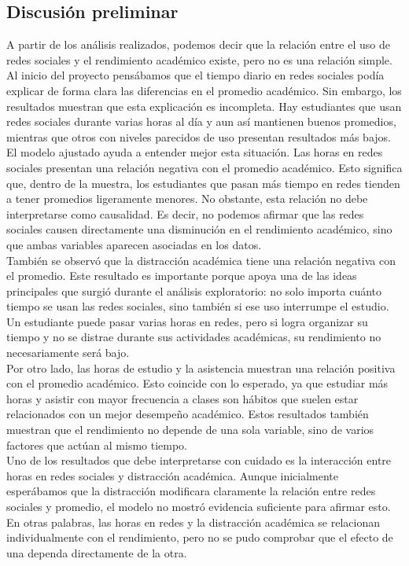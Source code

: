 \documentclass[12pt]{article}
\begin{document}
\subsection{Discusión preliminar}

A partir de los análisis realizados, podemos decir que la relación entre el uso de redes sociales y el rendimiento académico existe, pero no es una relación simple. Al inicio del proyecto pensábamos que el tiempo diario en redes sociales podía explicar de forma clara las diferencias en el promedio académico. Sin embargo, los resultados muestran que esta explicación es incompleta. Hay estudiantes que usan redes sociales durante varias horas al día y aun así mantienen buenos promedios, mientras que otros con niveles parecidos de uso presentan resultados más bajos.
\\

El modelo ajustado ayuda a entender mejor esta situación. Las horas en redes sociales presentan una relación negativa con el promedio académico. Esto significa que, dentro de la muestra, los estudiantes que pasan más tiempo en redes tienden a tener promedios ligeramente menores. No obstante, esta relación no debe interpretarse como causalidad. Es decir, no podemos afirmar que las redes sociales causen directamente una disminución en el rendimiento académico, sino que ambas variables aparecen asociadas en los datos.
\\

También se observó que la distracción académica tiene una relación negativa con el promedio. Este resultado es importante porque apoya una de las ideas principales que surgió durante el análisis exploratorio: no solo importa cuánto tiempo se usan las redes sociales, sino también si ese uso interrumpe el estudio. Un estudiante puede pasar varias horas en redes, pero si logra organizar su tiempo y no se distrae durante sus actividades académicas, su rendimiento no necesariamente será bajo.
\\

Por otro lado, las horas de estudio y la asistencia muestran una relación positiva con el promedio académico. Esto coincide con lo esperado, ya que estudiar más horas y asistir con mayor frecuencia a clases son hábitos que suelen estar relacionados con un mejor desempeño académico. Estos resultados también muestran que el rendimiento no depende de una sola variable, sino de varios factores que actúan al mismo tiempo.
\\

Uno de los resultados que debe interpretarse con cuidado es la interacción entre horas en redes sociales y distracción académica. Aunque inicialmente esperábamos que la distracción modificara claramente la relación entre redes sociales y promedio, el modelo no mostró evidencia suficiente para afirmar esto. En otras palabras, las horas en redes y la distracción académica se relacionan individualmente con el rendimiento, pero no se pudo comprobar que el efecto de una dependa directamente de la otra.
\\
\end{document}
